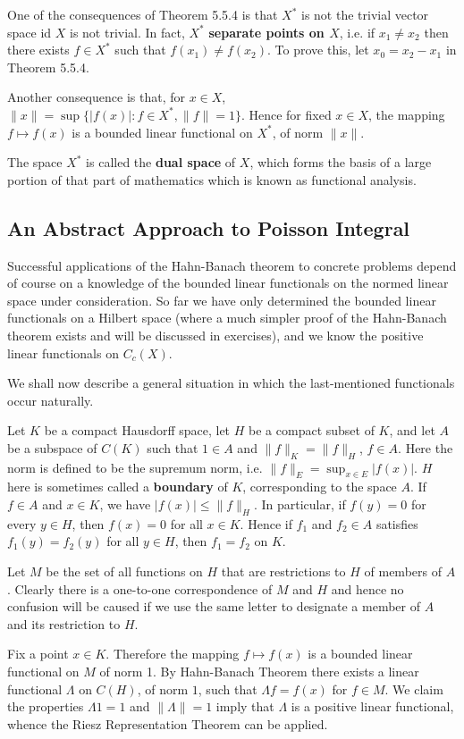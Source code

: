 One of the consequences of Theorem 5.5.4 is that $X^*$ is not the trivial vector space id $X$ is not trivial. In fact, $X^*$ \textbf{separate points on $X$}, i.e. if $x_1\ne x_2$ then there exists $f\in X^*$ such that $f(x_1)\ne f(x_2)$. To prove this, let $x_0=x_2-x_1$ in Theorem 5.5.4.\par
Another consequence is that, for $x\in X$, $\|x\|=\sup\{|f(x)|:f\in X^*,\|f\|=1\}$. Hence for fixed $x\in X$, the mapping $f\mapsto f(x)$ is a bounded linear functional on $X^*$, of norm $\|x\|$.\par
The space $X^*$ is called the \textbf{dual space} of $X$, which forms the basis of a large portion of that part of mathematics which is known as functional analysis.
\subsection{An Abstract Approach to Poisson Integral}
Successful applications of the Hahn-Banach theorem to concrete problems depend of course on a knowledge of the bounded linear functionals on the normed linear space under consideration. So far we have only determined the bounded linear functionals on a Hilbert space (where a much simpler proof of the Hahn-Banach theorem exists and will be discussed in exercises), and we know the positive linear functionals on $C_c(X)$.\par
We shall now describe a general situation in which the last-mentioned functionals occur naturally.\par
Let $K$ be a compact Hausdorff space, let $H$ be a compact subset of $K$, and let $A$ be a subspace of $C(K)$ such that $1\in A$ and $\|f\|_K=\|f\|_H$, $f\in A$. Here the norm is defined to be the supremum norm, i.e. $\|f\|_E=\sup_{x\in E}|f(x)|$. $H$ here is sometimes called a \textbf{boundary} of $K$, corresponding to the space $A$. If $f\in A$ and $x\in K$, we have $|f(x)|\le\|f\|_H$. In particular, if $f(y)=0$ for every $y\in H$, then $f(x)=0$ for all $x\in K$. Hence if $f_1$ and $f_2\in A$ satisfies $f_1(y)=f_2(y)$ for all $y\in H$, then $f_1=f_2$ on $K$.\par
Let $M$ be the set of all functions on $H$ that are restrictions to $H$ of members of $A$. Clearly there is a one-to-one correspondence of $M$ and $H$ and hence no confusion will be caused if we use the same letter to designate a member of $A$ and its restriction to $H$.\par
Fix a point $x\in K$. Therefore the mapping $f\mapsto f(x)$ is a bounded linear functional on $M$ of norm 1. By Hahn-Banach Theorem there exists a linear functional $\Lambda$ on $C(H)$, of norm $1$, such that $\Lambda f=f(x)$ for $f\in M$. We claim the properties $\Lambda 1=1$ and $\|\Lambda\|=1$ imply that $\Lambda$ is a positive linear functional, whence the Riesz Representation Theorem can be applied.\par

